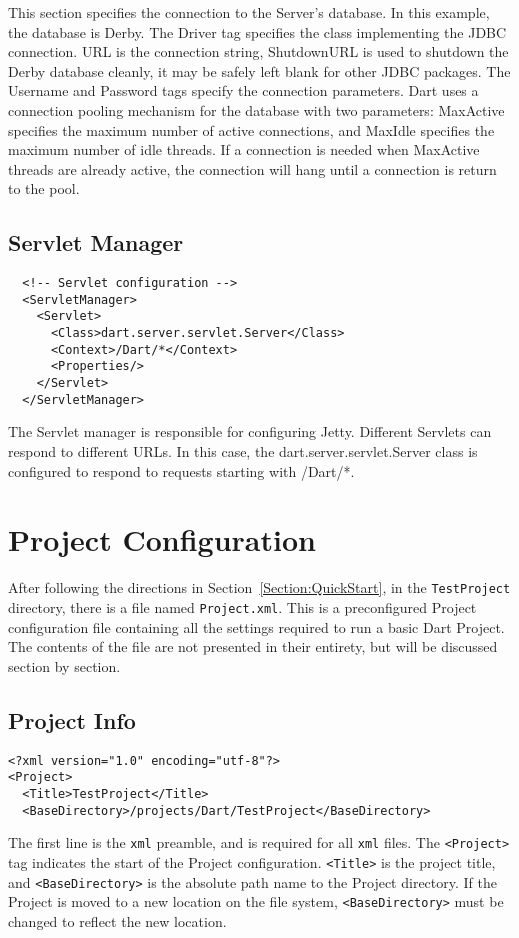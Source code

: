 \documentclass{InsightBook}
\newcommand{\xmltag}[1]{\texttt{<#1>}}
\newcommand{\filename}[1]{\texttt{#1}}
\begin{document}
This section specifies the connection to the Server's database.  In
this example, the database is Derby.  The Driver tag specifies the
class implementing the JDBC connection.  URL is the connection string,
ShutdownURL is used to shutdown the Derby database cleanly, it may be
safely left blank for other JDBC packages.  The Username and Password
tags specify the connection parameters.  Dart uses a connection
pooling mechanism for the database with two parameters: MaxActive
specifies the maximum number of active connections, and MaxIdle
specifies the maximum number of idle threads.  If a connection is
needed when MaxActive threads are already active, the connection will
hang until a connection is return to the pool.

\subsection{Servlet Manager}
\begin{verbatim}
  <!-- Servlet configuration -->
  <ServletManager>
    <Servlet>
      <Class>dart.server.servlet.Server</Class>
      <Context>/Dart/*</Context>
      <Properties/>
    </Servlet>
  </ServletManager>
\end{verbatim}

The Servlet manager is responsible for configuring Jetty.  Different
Servlets can respond to different URLs.  In this case, the
dart.server.servlet.Server class is configured to respond to requests
starting with /Dart/*.


\section{Project Configuration}
After following the directions in Section~\ref{Section:QuickStart}, in
the \texttt{TestProject} directory, there is a file named
\filename{Project.xml}.  This is a preconfigured Project configuration
file containing all the settings required to run a basic Dart
Project.  The contents of the file are not presented in their
entirety, but will be discussed section by section.

\subsection{Project Info}
\begin{verbatim}
<?xml version="1.0" encoding="utf-8"?>
<Project>
  <Title>TestProject</Title>
  <BaseDirectory>/projects/Dart/TestProject</BaseDirectory>
\end{verbatim}
The first line is the \texttt{xml} preamble, and is required for all
\texttt{xml} files.  The \xmltag{Project} tag indicates the start of
the Project configuration.  \xmltag{Title} is the project title, and
\xmltag{BaseDirectory} is the absolute path name to the Project
directory.  If the Project is moved to a new location on the file
system, \xmltag{BaseDirectory} must be changed to reflect the new
location.
\end{document}
